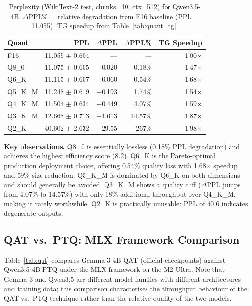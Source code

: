 \documentclass[11pt,a4paper]{article}
\begin{document}
\begin{table}[h]
\centering
\caption{Perplexity (WikiText-2 test, chunks=10, ctx=512) for Qwen3.5-4B.
$\Delta$PPL\% = relative degradation from F16 baseline (PPL\,=\,11.055).
TG speedup from Table~\ref{tab:quant_tg}.}
\label{tab:ppl}
\begin{tabular}{lrrrr}
\toprule
\textbf{Quant} & \textbf{PPL} & \textbf{$\Delta$PPL} & \textbf{$\Delta$PPL\%} & \textbf{TG Speedup} \\
\midrule
F16      & 11.055 $\pm$ 0.604 & ---    & ---     & 1.00$\times$ \\
Q8\_0    & 11.075 $\pm$ 0.605 & +0.020 & 0.18\%  & 1.47$\times$ \\
Q6\_K    & 11.115 $\pm$ 0.607 & +0.060 & 0.54\%  & 1.68$\times$ \\
Q5\_K\_M & 11.248 $\pm$ 0.619 & +0.193 & 1.74\%  & 1.54$\times$ \\
Q4\_K\_M & 11.504 $\pm$ 0.634 & +0.449 & 4.07\%  & 1.59$\times$ \\
Q3\_K\_M & 12.668 $\pm$ 0.713 & +1.613 & 14.57\% & 1.87$\times$ \\
Q2\_K    & 40.602 $\pm$ 2.632 & +29.55 & 267\%   & 1.98$\times$ \\
\bottomrule
\end{tabular}
\end{table}

\textbf{Key observations.}
Q8\_0 is essentially lossless (0.18\% PPL degradation) and achieves the highest
efficiency score (8.2).
Q6\_K is the Pareto-optimal production deployment choice, offering 0.54\% quality
loss with 1.68$\times$ speedup and 59\% size reduction.
Q5\_K\_M is dominated by Q6\_K on both dimensions and should generally be avoided.
Q3\_K\_M shows a quality cliff ($\Delta$PPL jumps from 4.07\% to 14.57\%) with
only 18\% additional throughput over Q4\_K\_M, making it rarely worthwhile.
Q2\_K is practically unusable: PPL of 40.6 indicates degenerate outputs.

\subsection{QAT vs.\ PTQ: MLX Framework Comparison}

Table~\ref{tab:qat} compares Gemma-3-4B QAT (official checkpoints) against
Qwen3.5-4B PTQ under the MLX framework on the M2 Ultra.
Note that Gemma-3 and Qwen3.5 are different model families with different
architectures and training data; this comparison characterises the throughput
behaviour of the QAT vs.\ PTQ technique rather than the relative quality of
the two models.
\end{document}
